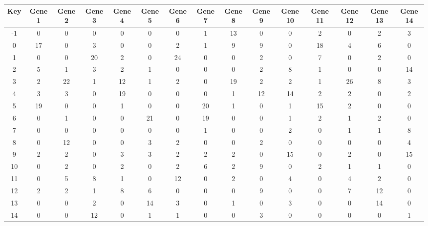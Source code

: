 \begin{tabular}{|c|c|c|c|c|c|c|c|c|c|c|c|c|c|c|}
\hline
Key & Gene 1 & Gene 2 & Gene 3 & Gene 4 & Gene 5 & Gene 6 & Gene 7 & Gene 8 & Gene 9 & Gene 10 & Gene 11 & Gene 12 & Gene 13 & Gene 14 \\
\hline
-1 & 0 & 0 & 0 & 0 & 0 & 0 & 1 & 13 & 0 & 0 & 2 & 0 & 2 & 3 \\
0 & 17 & 0 & 3 & 0 & 0 & 2 & 1 & 9 & 9 & 0 & 18 & 4 & 6 & 0 \\
1 & 0 & 0 & 20 & 2 & 0 & 24 & 0 & 0 & 2 & 0 & 7 & 0 & 2 & 0 \\
2 & 5 & 1 & 3 & 2 & 1 & 0 & 0 & 0 & 2 & 8 & 1 & 0 & 0 & 14 \\
3 & 2 & 22 & 1 & 12 & 1 & 2 & 0 & 19 & 2 & 2 & 1 & 26 & 8 & 3 \\
4 & 3 & 3 & 0 & 19 & 0 & 0 & 0 & 1 & 12 & 14 & 2 & 2 & 0 & 2 \\
5 & 19 & 0 & 0 & 1 & 0 & 0 & 20 & 1 & 0 & 1 & 15 & 2 & 0 & 0 \\
6 & 0 & 1 & 0 & 0 & 21 & 0 & 19 & 0 & 0 & 1 & 2 & 1 & 2 & 0 \\
7 & 0 & 0 & 0 & 0 & 0 & 0 & 1 & 0 & 0 & 2 & 0 & 1 & 1 & 8 \\
8 & 0 & 12 & 0 & 0 & 3 & 2 & 0 & 0 & 2 & 0 & 0 & 0 & 0 & 4 \\
9 & 2 & 2 & 0 & 3 & 3 & 2 & 2 & 2 & 0 & 15 & 0 & 2 & 0 & 15 \\
10 & 0 & 2 & 0 & 2 & 0 & 2 & 6 & 2 & 9 & 0 & 2 & 1 & 1 & 0 \\
11 & 0 & 5 & 8 & 1 & 0 & 12 & 0 & 2 & 0 & 4 & 0 & 4 & 2 & 0 \\
12 & 2 & 2 & 1 & 8 & 6 & 0 & 0 & 0 & 9 & 0 & 0 & 7 & 12 & 0 \\
13 & 0 & 0 & 2 & 0 & 14 & 3 & 0 & 1 & 0 & 3 & 0 & 0 & 14 & 0 \\
14 & 0 & 0 & 12 & 0 & 1 & 1 & 0 & 0 & 3 & 0 & 0 & 0 & 0 & 1 \\
\hline
\end{tabular}